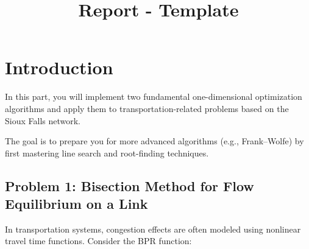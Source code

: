 \documentclass{rapportCS} %
\title{Report - Template}
\begin{document}







        
\fairemarges 
\fairepagedegarde 



\section{Introduction}

In this part, you will implement two fundamental one-dimensional optimization algorithms and apply them to transportation-related problems based on the Sioux Falls network.

The goal is to prepare you for more advanced algorithms (e.g., Frank–Wolfe) by first mastering line search and root-finding techniques.

\subsection*{Problem 1: Bisection Method for Flow Equilibrium on a Link}

In transportation systems, congestion effects are often modeled using nonlinear travel time functions. Consider the BPR function:
\end{document}

